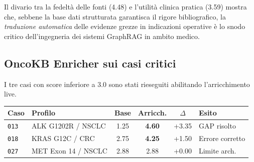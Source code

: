 \documentclass[11pt,a4paper]{article}
\newcommand{\bench}[1]{\texttt{\small #1}}
\begin{document}
\begin{center}
\end{center}

\begin{tesibox}
Il divario tra la fedelt\`a delle fonti (4.48) e l'utilit\`a clinica pratica (3.59) mostra che, sebbene la base dati strutturata garantisca il rigore bibliografico, la \emph{traduzione automatica} delle evidenze grezze in indicazioni operative \`e lo snodo critico dell'ingegneria dei sistemi GraphRAG in ambito medico.
\end{tesibox}

\subsection{OncoKB Enricher sui casi critici}
I tre casi con score inferiore a 3.0 sono stati rieseguiti abilitando l'arricchimento live.

\begin{center}
\small
\begin{tabular}{@{}llccc l@{}}
\toprule
Caso & Profilo & Base & Arricch. & $\Delta$ & Esito \\
\midrule
\bench{013} & ALK G1202R / NSCLC & 1.25 & \textbf{4.60} & \color{passgreen}+3.35 & GAP risolto \\
\bench{018} & KRAS G12C / CRC & 2.75 & \textbf{4.25} & \color{passgreen}+1.50 & Errore corretto \\
\bench{027} & MET Exon 14 / NSCLC & 2.88 & 2.88 & +0.00 & Limite arch. \\
\bottomrule
\end{tabular}
\end{center}
\end{document}
